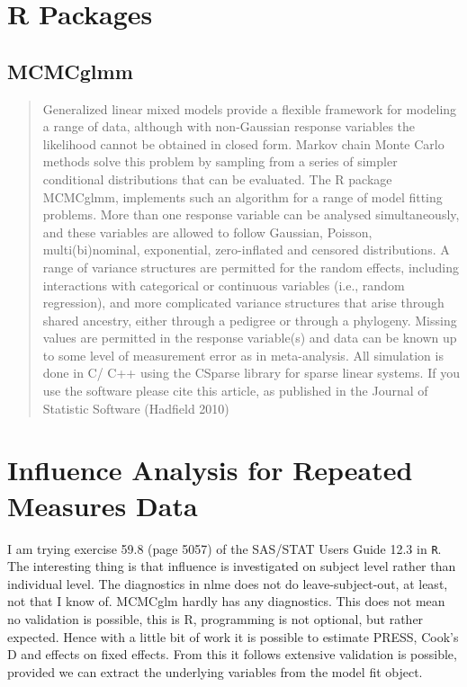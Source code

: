 \documentclass[a4paper,12pt]{article}
\begin{document}
 	\tableofcontents
 \section{R Packages}
 
 \subsection{MCMCglmm}
 \begin{quote}
 	Generalized linear mixed models provide a flexible framework for modeling a range of
 	data, although with non-Gaussian response variables the likelihood cannot be obtained in
 	closed form. Markov chain Monte Carlo methods solve this problem by sampling from a
 	series of simpler conditional distributions that can be evaluated. The R package MCMCglmm,
 	implements such an algorithm for a range of model fitting problems. More than
 	one response variable can be analysed simultaneously, and these variables are allowed to
 	follow Gaussian, Poisson, multi(bi)nominal, exponential, zero-inflated and censored distributions.
 	A range of variance structures are permitted for the random effects, including
 	interactions with categorical or continuous variables (i.e., random regression), and more
 	complicated variance structures that arise through shared ancestry, either through a pedigree
 	or through a phylogeny. Missing values are permitted in the response variable(s) and
 	data can be known up to some level of measurement error as in meta-analysis. All simulation
 	is done in C/ C++ using the CSparse library for sparse linear systems. If you
 	use the software please cite this article, as published in the Journal of Statistic Software
 	(Hadfield 2010)
 \end{quote}
\newpage
 \section{Influence Analysis for Repeated Measures Data}



 I am trying exercise 59.8 (page 5057) of the SAS/STAT Users Guide 12.3 in \texttt{R}. The interesting thing is that influence is investigated on subject level rather than individual level. The diagnostics in nlme does not do leave-subject-out, at least, not that I know of. MCMCglm hardly has any diagnostics. This does not mean no validation is possible, this is R, programming is not optional, but rather expected. Hence with a little bit of work it is possible to estimate PRESS, Cook's D and effects on fixed effects. From this it follows extensive validation is possible, provided we can extract the underlying variables from the model fit object.
\newpage
\end{document}
